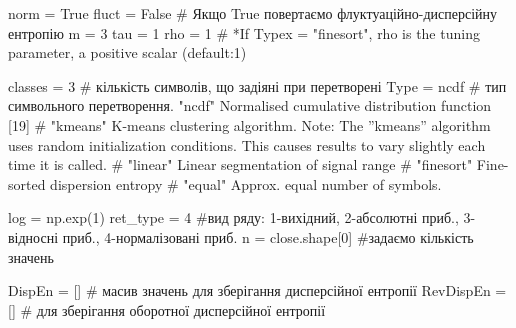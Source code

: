 \documentclass[
  letterpaper,
]{report}
\newenvironment{Shaded}{\begin{snugshade}}{\end{snugshade}}
\newcommand{\CommentTok}[1]{\textcolor[rgb]{0.37,0.37,0.37}{#1}}
\newcommand{\DecValTok}[1]{\textcolor[rgb]{0.68,0.00,0.00}{#1}}
\newcommand{\NormalTok}[1]{\textcolor[rgb]{0.00,0.23,0.31}{#1}}
\newcommand{\OperatorTok}[1]{\textcolor[rgb]{0.37,0.37,0.37}{#1}}
\newcommand{\StringTok}[1]{\textcolor[rgb]{0.13,0.47,0.30}{#1}}
\newcommand{\VariableTok}[1]{\textcolor[rgb]{0.07,0.07,0.07}{#1}}
\begin{document}
\begin{Shaded}
\begin{Highlighting}[]
\NormalTok{norm }\OperatorTok{=} \VariableTok{True}
\NormalTok{fluct }\OperatorTok{=} \VariableTok{False} \CommentTok{\# Якщо True повертаємо флуктуаційно{-}дисперсійну ентропію}
\NormalTok{m }\OperatorTok{=} \DecValTok{3} 
\NormalTok{tau }\OperatorTok{=} \DecValTok{1}
\NormalTok{rho }\OperatorTok{=} \DecValTok{1} \CommentTok{\# *If Typex = "finesort", rho is the tuning parameter, a positive scalar (default:1)}

\NormalTok{classes }\OperatorTok{=} \DecValTok{3} \CommentTok{\# кількість символів, що задіяні при перетворені}
\NormalTok{Type }\OperatorTok{=} \StringTok{\textquotesingle{}ncdf\textquotesingle{}} \CommentTok{\# тип символьного перетворення. "ncdf" Normalised cumulative distribution function [19]}
                                            \CommentTok{\# "kmeans" K{-}means clustering algorithm. Note: The ”kmeans” algorithm uses random initialization conditions. This causes results to vary slightly each time it is called.}
                                            \CommentTok{\# "linear" Linear segmentation of signal range}
                                            \CommentTok{\# "finesort" Fine{-}sorted dispersion entropy}
                                            \CommentTok{\# "equal" Approx. equal number of symbols.}

\NormalTok{log }\OperatorTok{=}\NormalTok{ np.exp(}\DecValTok{1}\NormalTok{)}
\NormalTok{ret\_type }\OperatorTok{=} \DecValTok{4} \CommentTok{\#вид ряду: 1{-}вихідний, 2{-}абсолютні приб., 3{-}відносні приб., 4{-}нормалізовані приб. }
\NormalTok{n }\OperatorTok{=}\NormalTok{ close.shape[}\DecValTok{0}\NormalTok{] }\CommentTok{\#задаємо кількість значень}

\NormalTok{DispEn }\OperatorTok{=}\NormalTok{ [] }\CommentTok{\# масив значень для зберігання дисперсійної ентропії }
\NormalTok{RevDispEn }\OperatorTok{=}\NormalTok{ [] }\CommentTok{\# для зберігання оборотної дисперсійної ентропії}
\end{Highlighting}
\end{Shaded}
\end{document}
